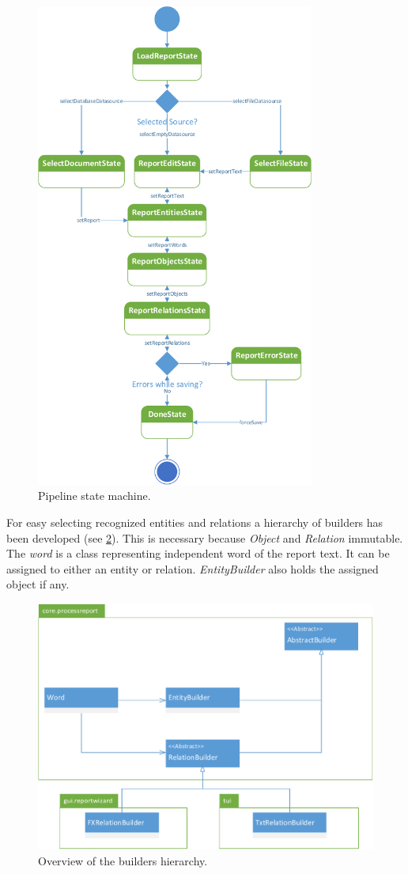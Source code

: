 \begin{figure}[!htb]
        \centering
        \includegraphics[height=16cm]{Images/Pipeline}
        \caption{Pipeline state machine.}
        \label{fig:Pipeline}
\end{figure}

For easy selecting recognized entities and relations a hierarchy of builders
has been developed (see \ref{fig:Builders}). This is necessary because
\emph{Object} and \emph{Relation} immutable. The \emph{word} is a class
representing independent word of the report text. It can be assigned to either
an entity or relation. \emph{EntityBuilder} also holds the assigned object if
any.

\begin{figure}[!htb]
        \centering
        \includegraphics[width=\textwidth]{Images/Builders}
        \caption{Overview of the builders hierarchy.}
        \label{fig:Builders}
\end{figure}

